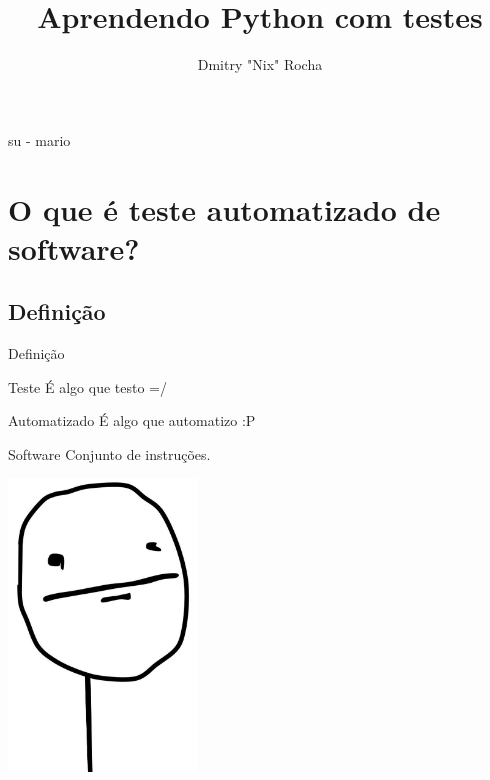\documentclass[]{beamer}
\author{Dmitry "Nix" Rocha}
\title{Aprendendo Python com testes}
\institute{ /(guru|pug-)pi/i }
\begin{document}
  \begin{frame}{}
    \titlepage
  \end{frame}

  \begin{frame}{su - mario}
    \tableofcontents
  \end{frame}

  \section{O que é teste automatizado de software?}

  \subsection*{Definição}
  \begin{frame}
    \begin{center}
      \Huge Definição
    \end{center}
  \end{frame}

  \begin{frame}{}
    \begin{block}{Teste}
      É algo que testo =/
    \end{block}
    \pause

    \begin{block}{Automatizado}
      É algo que automatizo :P
    \end{block}
    \pause

    \begin{block}{Software}
      Conjunto de instruções.
    \end{block}
    \pause
  \end{frame}

  \begin{frame}{}
    \begin{center}
      \includegraphics[width=5cm]{images/pokerface}
    \end{center}
  \end{frame}
\end{document}
